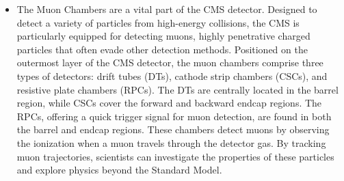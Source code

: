 \begin{itemize}

\item The Muon Chambers \cite{CMS:2018rym} are a vital part of the CMS detector. Designed to detect a variety of particles from high-energy collisions, the CMS is particularly equipped for detecting muons, highly penetrative charged particles that often evade other detection methods. Positioned on the outermost layer of the CMS detector, the muon chambers comprise three types of detectors: drift tubes (DTs), cathode strip chambers (CSCs), and resistive plate chambers (RPCs). The DTs are centrally located in the barrel region, while CSCs cover the forward and backward endcap regions. The RPCs, offering a quick trigger signal for muon detection, are found in both the barrel and endcap regions. These chambers detect muons by observing the ionization when a muon travels through the detector gas. By tracking muon trajectories, scientists can investigate the properties of these particles and explore physics beyond the Standard Model.



\end{itemize}
